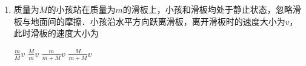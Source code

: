 \begin{enumerate}[leftmargin=0em]
{\begin{enumerate}
\end{enumerate}


}


\item 
{}
质量为$ M $的小孩站在质量为$ m $的滑板上，小孩和滑板均处于静止状态，忽略滑板与地面间的摩擦．小孩沿水平方向跃离滑板，离开滑板时的速度大小为$ v $，此时滑板的速度大小为  

\fourchoices
{$ \frac { m } { M } v $}
{$ \frac { M } { m } v $}
{$ \frac { m } { m + M } v $}
{$ \frac { M } { m + M } v $}








\end{enumerate}



